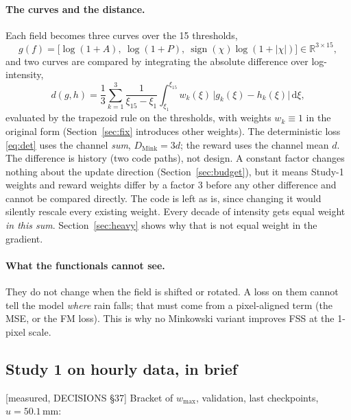 \documentclass[11pt,a4paper]{article}
\newcommand{\R}{\mathbb{R}}
\newcommand{\status}[1]{\textsf{\small[#1]}}
\begin{document}
\paragraph{The curves and the distance.} Each field becomes three curves over the 15 thresholds,
\begin{equation}
  g(f) = \big[\log(1+A),\ \log(1+P),\ \operatorname{sign}(\chi)\log(1+|\chi|)\big] \in \R^{3\times 15},
\end{equation}
and two curves are compared by integrating the absolute difference over log-intensity,
\begin{equation}\label{eq:dist}
  d(g,h) = \frac13\sum_{k=1}^{3}\frac{1}{\xi_{15}-\xi_1}\int_{\xi_1}^{\xi_{15}} w_k(\xi)\,\big|g_k(\xi)-h_k(\xi)\big|\,\mathrm d\xi ,
\end{equation}
evaluated by the trapezoid rule on the thresholds, with weights $w_k\equiv1$ in the original form (Section~\ref{sec:fix}
introduces other weights). The deterministic loss \eqref{eq:det} uses the channel \emph{sum}, $D_{\mathrm{Mink}} = 3d$;
the reward uses the channel mean $d$. The difference is history (two code paths), not design. A constant factor changes
nothing about the update direction (Section~\ref{sec:budget}), but it means Study-1 weights and reward weights differ by
a factor 3 before any other difference and cannot be compared directly. The code is left as is, since changing it would
silently rescale every existing weight. Every decade of intensity gets equal weight \emph{in this sum}.
Section~\ref{sec:heavy} shows why that is not equal weight in the gradient.

\paragraph{What the functionals cannot see.} They do not change when the field is shifted or rotated. A loss on them
cannot tell the model \emph{where} rain falls; that must come from a pixel-aligned term (the MSE, or the FM loss).
This is why no Minkowski variant improves FSS at the 1-pixel scale.

\subsection{Study 1 on hourly data, in brief}\label{sec:study1}
\status{measured, DECISIONS \S37} Bracket of $w_{\max}$, validation, last checkpoints, $u = 50.1$\,mm:
\end{document}
